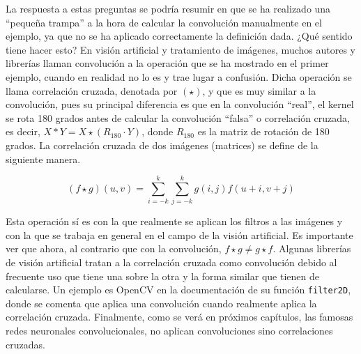 		La respuesta a estas preguntas se podría resumir en que se ha realizado una ``pequeña trampa'' a la hora de calcular la convolución manualmente en el ejemplo, ya que no se ha aplicado correctamente la definición dada. ¿Qué sentido tiene hacer esto? En visión artificial y tratamiento de imágenes, muchos autores y librerías llaman convolución a la operación que se ha mostrado en el primer ejemplo, cuando en realidad no lo es y trae lugar a confusión. Dicha operación se llama correlación cruzada, denotada por $(\star)$, y que es muy similar a la convolución, pues su principal diferencia es que en la convolución ``real'', el kernel se rota 180 grados antes de calcular la convolución ``falsa'' o correlación cruzada, es decir, $X \ast Y = X \star (R_{180} \cdot Y)$, donde $R_{180}$ es la matriz de rotación de 180 grados. La correlación cruzada de dos imágenes (matrices) se define de la siguiente manera\cite{Goodfellow-et-al-2016}. 
		
		$$
		(f \star g)(u, v) = \sum_{i=-k}^{k}\sum_{j=-k}^{k} g(i, j)f(u + i, v + j)
		$$
		
		Esta operación sí es con la que realmente se aplican los filtros a las imágenes y con la que se trabaja en general en el campo de la visión artificial. Es importante ver que ahora, al contrario que con la convolución, $f \star g \neq g \star f$. Algunas librerías de visión artificial tratan a la correlación cruzada como convolución debido al frecuente uso que tiene una sobre la otra y la forma similar que tienen de calcularse. Un ejemplo es OpenCV en la documentación de su función \texttt{filter2D}, donde se comenta que aplica una convolución cuando realmente aplica la correlación cruzada\cite{OpenCVFiltering}. Finalmente, como se verá en próximos capítulos, las famosas redes neuronales convolucionales, no aplican convoluciones sino correlaciones cruzadas. 
